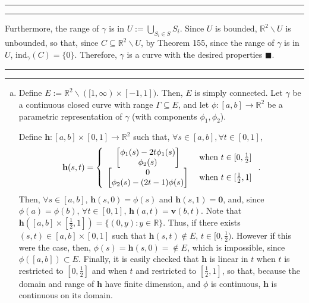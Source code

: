 \documentclass[11pt]{article}
\newcounter{questionCounter}
\newcounter{partCounter}[questionCounter]
\newenvironment{question}[2][\arabic{questionCounter}]{%
    \setcounter{partCounter}{0}%
    \vspace{.25in} \hrule \vspace{0.5em}%
        \noindent{\bf #2}%
    \vspace{0.8em} \hrule \vspace{.10in}%
    \addtocounter{questionCounter}{1}%
}{}
\begin{document}
\begin{question}{Problem 2}
Furthermore, the range of $\gamma$ is in $U := \bigcup_{S_i \in S} S_i$. Since
$U$ is bounded, $\mathbb{R}^2\backslash U$ is unbounded, so that, since
$C \subseteq \mathbb{R}^2\backslash U$, by Theorem 155, since the range of
$\gamma$ is in $U$, ind$_{\gamma}(C) = \{0\}$. Therefore, $\gamma$ is a curve
with the desired properties \quad $\blacksquare$.
\end{question}

\newpage
\begin{question}{Problem 3}
\begin{enumerate}[(a)]
\item Define $E :=  \mathbb{R}^2 \backslash ([1,\infty) \times [-1,1])$. Then,
$E$ is simply connected.
Let $\gamma$ be a continuous closed curve with range $\Gamma \subseteq E$, and
let $\phi: [a,b] \rightarrow \mathbb{R}^2$ be a parametric representation of
$\gamma$ (with components $\phi_1,\phi_2$).

Define $\mathbf{h}: [a,b] \times [0,1] \rightarrow \mathbb{R}^2$ such that,
$\forall s \in [a,b], \forall t \in [0,1]$,
\[\mathbf{h}(s,t) = \left\{
                        \begin{array}{c c}
                            \begin{bmatrix}
                                \phi_1(s) - 2t\phi_1(s)    \\
                                \phi_2(s)
                            \end{bmatrix}
                                  & \mbox{ when } t \in [0,\frac12]      \\
                            \begin{bmatrix}
                                0 \\
                                \phi_2(s) - (2t - 1)\phi(s)
                            \end{bmatrix}
                                  & \mbox{ when } t \in [\frac12,1]      \\
                        \end{array}
                    \right.
.\]
Then, $\forall s \in [a,b]$, $\mathbf{h}(s,0) = \phi(s)$ and
$\mathbf{h}(s,1) = \mathbf{0}$, and, since $\phi(a) = \phi(b)$,
$\forall t \in [0,1]$, $\mathbf{h}(a,t) = \mathbf{v}(b,t)$. Note that
$\mathbf{h}([a,b] \times [\frac12, 1]) = \{(0,y) : y \in \mathbb{R}\}$. Thus,
if there exists $(s,t) \in [a,b] \times [0,1]$ such that
$\mathbf{h}(s,t) \not \in E$, $t \in [0,\frac12)$. However if this were the
case, then, $\phi(s) = \mathbf{h}(s,0) = \not \in E$, which is impossible,
since $\phi([a,b]) \subset E$. Finally, it is easily checked that $\mathbf{h}$
is linear in $t$ when $t$ is restricted to $[0,\frac12]$ and when $t$ and
restricted to $[\frac12,1]$, so that, because the domain and range of
$\mathbf{h}$ have finite dimension, and $\phi$ is continuous, $\mathbf{h}$ is
continuous on its domain.


\end{enumerate}
\end{question}
\end{document}

